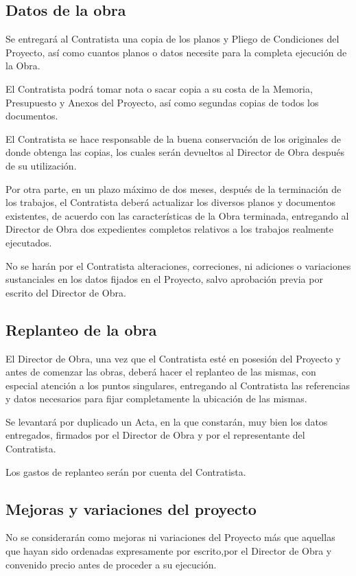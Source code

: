 \subsection{Datos de la obra}
\label{subsec:pliego-datosOrg}
Se entregará al Contratista una copia de los planos y Pliego de Condiciones del Proyecto, así como cuantos planos o datos necesite para la completa ejecución de la Obra.

El Contratista podrá tomar nota o sacar copia a su costa de la Memoria, Presupuesto y Anexos del Proyecto, así como segundas copias de todos los documentos.

El Contratista se hace responsable de la buena conservación de los originales de donde  obtenga las copias, los cuales serán devueltos al Director de Obra después de su utilización.  

Por otra parte, en un plazo máximo de dos meses, después de la terminación de los trabajos, el Contratista deberá actualizar los diversos planos y documentos existentes, de acuerdo con las características de la Obra terminada, entregando al Director de Obra dos expedientes  completos relativos a los trabajos realmente ejecutados.  

No se harán por el Contratista alteraciones, correciones, ni adiciones o variaciones sustanciales en los datos fijados en el Proyecto, salvo aprobación previa por escrito del Director de Obra.
\subsection{Replanteo de la obra}
\label{subsec:pliego-replanteoOrg}
El Director de Obra, una vez que el Contratista esté en posesión del Proyecto y antes de comenzar las obras, deberá hacer el replanteo de las mismas, con especial atención a los puntos singulares, entregando al Contratista las referencias y datos necesarios para fijar completamente  la ubicación de las mismas.  

Se levantará por duplicado un Acta, en la que constarán, muy bien los datos entregados,  firmados por el Director de Obra y por el representante del Contratista.  

Los gastos de replanteo serán por cuenta del Contratista.   
\subsection{Mejoras y variaciones del proyecto}
\label{subsec:pliego-mejorasOrg}
No se considerarán como mejoras ni variaciones del Proyecto más que aquellas que hayan sido ordenadas expresamente por escrito,por el Director de Obra y convenido precio antes de proceder a su ejecución.  

